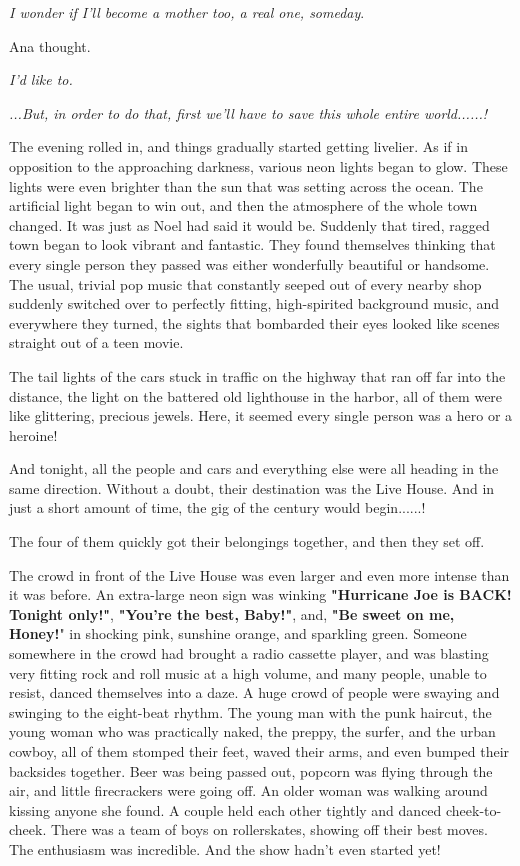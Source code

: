 \documentclass[
]{article}
\begin{document}
\emph{I wonder if I'll become a mother too, a real one, someday}.

Ana thought.

\emph{I'd like to.}

\emph{...But, in order to do that, first we'll have to save this whole
entire world......!}

The evening rolled in, and things gradually started getting livelier. As
if in opposition to the approaching darkness, various neon lights began
to glow. These lights were even brighter than the sun that was setting
across the ocean. The artificial light began to win out, and then the
atmosphere of the whole town changed. It was just as Noel had said it
would be. Suddenly that tired, ragged town began to look vibrant and
fantastic. They found themselves thinking that every single person they
passed was either wonderfully beautiful or handsome. The usual, trivial
pop music that constantly seeped out of every nearby shop suddenly
switched over to perfectly fitting, high-spirited background music, and
everywhere they turned, the sights that bombarded their eyes looked like
scenes straight out of a teen movie.

The tail lights of the cars stuck in traffic on the highway that ran off
far into the distance, the light on the battered old lighthouse in the
harbor, all of them were like glittering, precious jewels. Here, it
seemed every single person was a hero or a heroine!

And tonight, all the people and cars and everything else were all
heading in the same direction. Without a doubt, their destination was
the Live House. And in just a short amount of time, the gig of the
century would begin......!

The four of them quickly got their belongings together, and then they
set off.

The crowd in front of the Live House was even larger and even more
intense than it was before. An extra-large neon sign was winking
\textbf{"Hurricane Joe is BACK! Tonight only!"}, \textbf{"You're the
best, Baby!"}, and, \textbf{"Be sweet on me, Honey!}" in shocking pink,
sunshine orange, and sparkling green. Someone somewhere in the crowd had
brought a radio cassette player, and was blasting very fitting rock and
roll music at a high volume, and many people, unable to resist, danced
themselves into a daze. A huge crowd of people were swaying and swinging
to the eight-beat rhythm. The young man with the punk haircut, the young
woman who was practically naked, the preppy, the surfer, and the urban
cowboy, all of them stomped their feet, waved their arms, and even
bumped their backsides together. Beer was being passed out, popcorn was
flying through the air, and little firecrackers were going off. An older
woman was walking around kissing anyone she found. A couple held each
other tightly and danced cheek-to-cheek. There was a team of boys on
rollerskates, showing off their best moves. The enthusiasm was
incredible. And the show hadn't even started yet!
\end{document}
